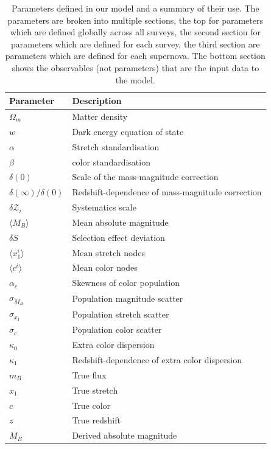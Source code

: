 \documentclass[a4paper,fleqn,usenatbib]{mnras}
\begin{document}
\begin{table}
	\centering
	\caption{ Parameters defined in our model and a summary of their use. The parameters are broken into multiple sections, the top for parameters which are defined globally across all surveys, the second section for parameters which are defined for each survey, the third section are parameters which are defined for each supernova. The bottom section shows the observables (not parameters) that are the input data to the model.}
	\label{tab:param_summary}
	\begin{tabular}{ll}
		\hline
		Parameter & Description \\
		\hline
		$\Omega_m$  & Matter density  \\
		$w$  &  Dark energy equation of state  \\
		$\alpha$ & Stretch standardisation   \\
		$\beta$         &  color standardisation   \\
		$\delta(0)$ & Scale of the mass-magnitude correction\\
		$\delta(\infty)/\delta(0)$ & Redshift-dependence of mass-magnitude correction\\
		$\delta\mathcal{Z}_i$ & Systematics scale\\
		$\langle M_B \rangle$ & Mean absolute magnitude \\
		\hline
		$\delta S$ & Selection effect deviation \\
		$\langle x_1^i \rangle$ & Mean stretch nodes\\
		$\langle c^i \rangle$ & Mean color nodes\\
		$\alpha_c$ & Skewness of color population \\
		$\sigma_{M_B}$ & Population magnitude scatter \\
		$\sigma_{x_1}$ & Population stretch scatter \\
		$\sigma_{c}$ & Population color scatter \\
		$\kappa_{0}$ & Extra color dispersion\\
		$\kappa_{1}$ & Redshift-dependence of extra color dispersion\\
		\hline
		$m_B$ & True flux\\
		$x_1$ & True stretch \\
		$c$ & True color \\
		$z$ & True redshift \\
		$M_B$ & Derived absolute magnitude \\

\end{tabular}
\end{table}
\end{document}
